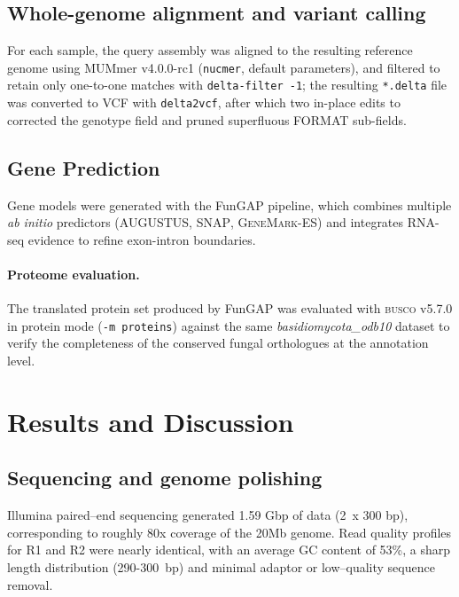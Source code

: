 \documentclass[Journal,letterpaper]{ascelike-new}
\begin{document}
\subsection*{Whole-genome alignment and variant calling}

For each sample, the query assembly was aligned to the resulting
reference genome using MUMmer v4.0.0-rc1 (\verb|nucmer|, default
parameters), and filtered to retain only one-to-one matches with
\verb|delta-filter -1|; the resulting \texttt{*.delta} file was
converted to VCF with \verb|delta2vcf|, after which two in-place
edits to corrected the genotype field and pruned superfluous FORMAT sub-fields.

\subsection*{Gene Prediction}

Gene models were generated with the FunGAP pipeline, which combines
multiple \textit{ab initio} predictors (\textsc{AUGUSTUS},
\textsc{SNAP}, \textsc{GeneMark-ES}) and integrates RNA-seq evidence
to refine exon-intron boundaries.

\paragraph{Proteome evaluation.} The translated protein set produced
by FunGAP was evaluated with \textsc{busco} v5.7.0 in protein mode
(\texttt{-m proteins}) against the same \textit{basidiomycota\_odb10}
dataset to verify the completeness of the conserved fungal
orthologues at the annotation level.

\section*{Results and Discussion}

\subsection*{Sequencing and genome polishing}

Illumina paired--end sequencing generated 1.59 Gbp of data (2~x 300
bp), corresponding to roughly 80x coverage of the 20Mb genome. Read
quality profiles for R1 and R2 were nearly identical, with an average
GC content of 53\%, a sharp length distribution (290-300~bp) and
minimal adaptor or low--quality sequence removal.
\end{document}
